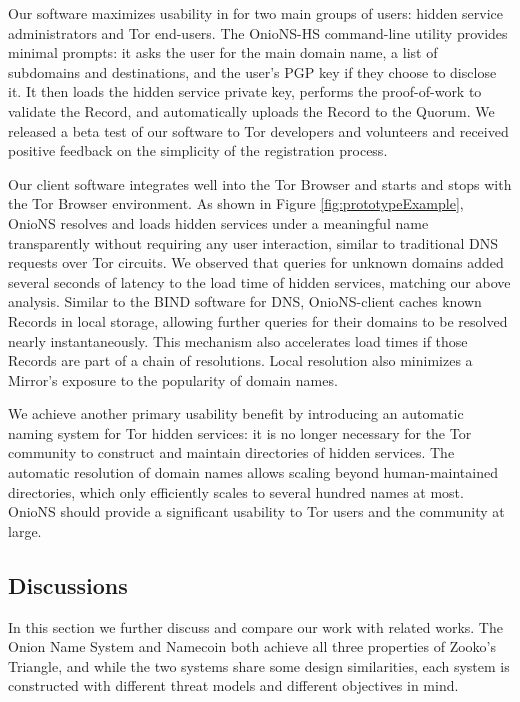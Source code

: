 \documentclass[USenglish,oneside,twocolumn]{article}
\begin{document}
Our software maximizes usability in for two main groups of users: hidden service administrators and Tor end-users. The OnioNS-HS command-line utility provides minimal prompts: it asks the user for the main domain name, a list of subdomains and destinations, and the user's PGP key if they choose to disclose it. It then loads the hidden service private key, performs the proof-of-work to validate the Record, and automatically uploads the Record to the Quorum. We released a beta test of our software to Tor developers and volunteers and received positive feedback on the simplicity of the registration process.

Our client software integrates well into the Tor Browser and starts and stops with the Tor Browser environment. As shown in Figure \ref{fig:prototypeExample}, OnioNS resolves and loads hidden services under a meaningful name transparently without requiring any user interaction, similar to traditional DNS requests over Tor circuits. We observed that queries for unknown domains added several seconds of latency to the load time of hidden services, matching our above analysis. Similar to the BIND software for DNS, OnioNS-client caches known Records in local storage, allowing further queries for their domains to be resolved nearly instantaneously. This mechanism also accelerates load times if those Records are part of a chain of resolutions. Local resolution also minimizes a Mirror's exposure to the popularity of domain names.


We achieve another primary usability benefit by introducing an automatic naming system for Tor hidden services: it is no longer necessary for the Tor community to construct and maintain directories of hidden services. The automatic resolution of domain names allows scaling beyond human-maintained directories, which only efficiently scales to several hundred names at most. OnioNS should provide a significant usability to Tor users and the community at large.

\subsection{Discussions}

In this section we further discuss and compare our work with related works. The Onion Name System and Namecoin both achieve all three properties of Zooko's Triangle, and while the two systems share some design similarities, each system is constructed with different threat models and different objectives in mind.
\end{document}
